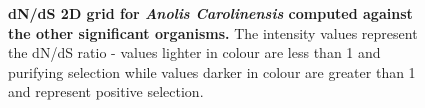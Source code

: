 \documentclass{article}
\begin{document}
\begin{figure}[H]
\centering
{}
\caption{\textbf{dN/dS 2D grid for \textit{Anolis Carolinensis} computed against the other significant organisms.} The intensity values represent the dN/dS ratio - values lighter in colour are less than 1 and purifying selection while values darker in colour are greater than 1 and represent positive selection.}
\label{sup_fig_20}
\end{figure}
\end{document}

